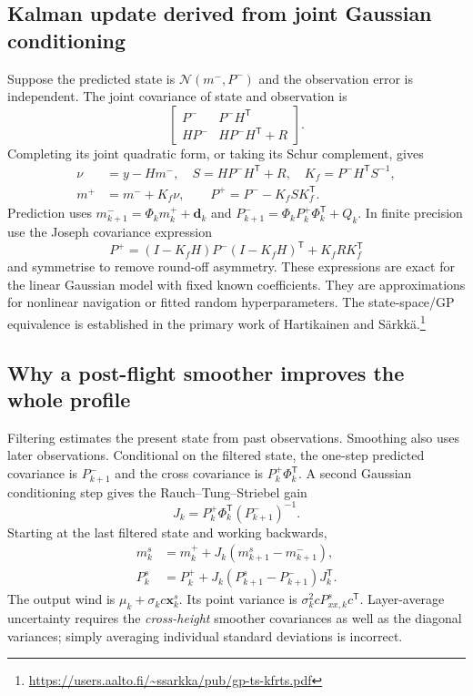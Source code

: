 \subsection{Kalman update derived from joint Gaussian conditioning}
Suppose the predicted state is $\mathcal N(m^-,P^-)$ and the observation error is independent. The joint covariance of state and observation is
\begin{equation}
 \begin{bmatrix}P^-&P^-H^{\mathsf T}\\HP^-&HP^-H^{\mathsf T}+R\end{bmatrix}.
\end{equation}
Completing its joint quadratic form, or taking its Schur complement, gives
\begin{align}
 \nu&=y-Hm^-,\quad S=HP^-H^{\mathsf T}+R,\quad K_f=P^-H^{\mathsf T}S^{-1},\\
 m^+&=m^-+K_f\nu,\qquad
 P^+=P^--K_fSK_f^{\mathsf T}.
\end{align}
Prediction uses $m^-_{k+1}=\Phi_k m^+_k+\mathbf d_k$ and $P^-_{k+1}=\Phi_kP^+_k\Phi_k^{\mathsf T}+Q_k$. In finite precision use the Joseph covariance expression
\begin{equation}
 P^+=(I-K_fH)P^-(I-K_fH)^{\mathsf T}+K_fRK_f^{\mathsf T}
\end{equation}
and symmetrise to remove round-off asymmetry. These expressions are exact for the linear Gaussian model with fixed known coefficients. They are approximations for nonlinear navigation or fitted random hyperparameters. The state-space/GP equivalence is established in the primary work of Hartikainen and S\"arkk\"a.\footnote{\url{https://users.aalto.fi/~ssarkka/pub/gp-ts-kfrts.pdf}}

\subsection{Why a post-flight smoother improves the whole profile}
Filtering estimates the present state from past observations. Smoothing also uses later observations. Conditional on the filtered state, the one-step predicted covariance is $P^-_{k+1}$ and the cross covariance is $P^+_k\Phi_k^{\mathsf T}$. A second Gaussian conditioning step gives the Rauch--Tung--Striebel gain
\begin{equation}
 J_k=P^+_k\Phi_k^{\mathsf T}(P^-_{k+1})^{-1}.
\end{equation}
Starting at the last filtered state and working backwards,
\begin{align}
 m^s_k&=m^+_k+J_k(m^s_{k+1}-m^-_{k+1}),\\
 P^s_k&=P^+_k+J_k(P^s_{k+1}-P^-_{k+1})J_k^{\mathsf T}.
\end{align}
The output wind is $\mu_k+\sigma_k c\mathbf x^s_k$. Its point variance is $\sigma_k^2 cP^s_{xx,k}c^{\mathsf T}$. Layer-average uncertainty requires the \emph{cross-height} smoother covariances as well as the diagonal variances; simply averaging individual standard deviations is incorrect.

